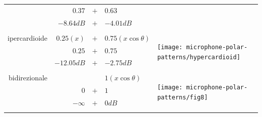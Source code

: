 \begin{refsection}
\begin{table}[ht]
\begin{center}
\begin{tabular}{rrcll}
                & $0.37$       & $+$ & $0.63$               & \\
                & $-8.64dB$    & $+$ & $-4.01dB$            & \\ %
& \\
\hline
ipercardioide   & $0.25(x)$    & $+$ & $0.75(x\cos\theta)$  &
 \multirow{4}{*}{\begin{minipage}{.25\textwidth}\texttt{[image: microphone-polar-patterns/hypercardioid]}\end{minipage}} \\
                & $0.25$       & $+$ & $0.75$               & \\
                & $-12.05dB$ & $+$ & $-2.75dB$              & \\ %
& \\
\hline
bidirezionale   &              &     & $1(x\cos\theta)$     &
 \multirow{4}{*}{\begin{minipage}{.25\textwidth}\texttt{[image: microphone-polar-patterns/fig8]}\end{minipage}} \\
                & $0$          & $+$ & $1$                  & \\
                & $-\infty$    & $+$ & $0dB$            & \\ %
& \\
\end{tabular}
\end{center}
\label{tab:polarcoef}
\end{table}

\clearpage


\end{refsection}
